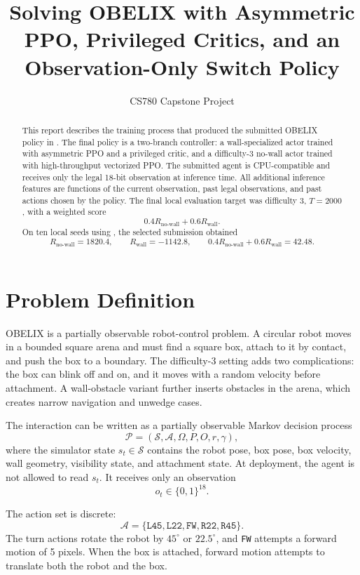 \documentclass[11pt]{article}
\title{\textbf{Solving OBELIX with Asymmetric PPO, Privileged Critics, and an Observation-Only Switch Policy}}
\author{CS780 Capstone Project}
\date{}
\begin{document}
\maketitle

\begin{abstract}
This report describes the training process that produced the submitted OBELIX policy in
.  The
final policy is a two-branch controller: a wall-specialized actor trained with
asymmetric PPO and a privileged critic, and a difficulty-3 no-wall actor trained with
high-throughput vectorized PPO.  The submitted agent is CPU-compatible and receives
only the legal 18-bit observation at inference time.  All additional inference
features are functions of the current observation, past legal observations, and past
actions chosen by the policy.  The final local evaluation target was difficulty 3,
\(T=2000\), with a weighted score
\[
  0.4 R_{\text{no-wall}} + 0.6 R_{\text{wall}}.
\]
On ten local seeds using , the selected submission obtained
\[
  R_{\text{no-wall}} = 1820.4,\qquad
  R_{\text{wall}} = -1142.8,\qquad
  0.4R_{\text{no-wall}} + 0.6R_{\text{wall}} = 42.48.
\]
\end{abstract}

\section{Problem Definition}

OBELIX is a partially observable robot-control problem.  A circular robot moves in a
bounded square arena and must find a square box, attach to it by contact, and push the
box to a boundary.  The difficulty-3 setting adds two complications: the box can blink
off and on, and it moves with a random velocity before attachment.  A wall-obstacle
variant further inserts obstacles in the arena, which creates narrow navigation and
unwedge cases.

The interaction can be written as a partially observable Markov decision process
\[
  \mathcal{P} = (\mathcal{S}, \mathcal{A}, \Omega, P, O, r, \gamma),
\]
where the simulator state \(s_t \in \mathcal{S}\) contains the robot pose, box pose,
box velocity, wall geometry, visibility state, and attachment state.  At deployment,
the agent is not allowed to read \(s_t\).  It receives only an observation
\[
  o_t \in \{0,1\}^{18}.
\]

The action set is discrete:
\[
  \mathcal{A} = \{\texttt{L45},\texttt{L22},\texttt{FW},\texttt{R22},\texttt{R45}\}.
\]
The turn actions rotate the robot by \(45^\circ\) or \(22.5^\circ\), and
\texttt{FW} attempts a forward motion of 5 pixels.  When the box is attached, forward
motion attempts to translate both the robot and the box.
\end{document}
